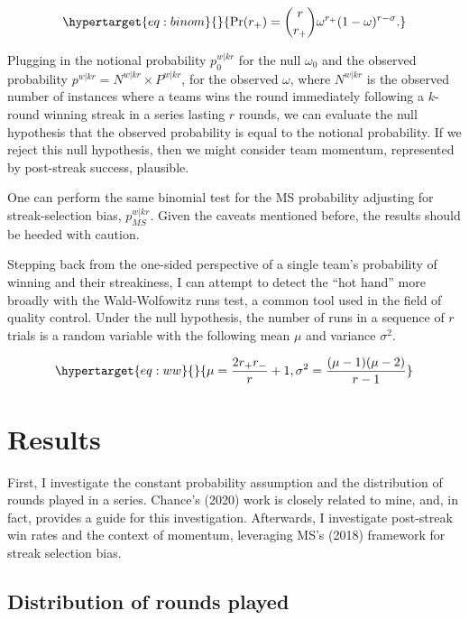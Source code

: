 \documentclass{article}
\begin{document}
\begin{equation}\protect\hypertarget{eq:binom}{}{
\Pr(r_+) = {\binom {r}{r_+}} \omega^{r_+}(1-\omega)^{r-\sigma}.
}\label{eq:binom}\end{equation}

Plugging in the notional probability \(p^{w|kr}_0\) for the null
\(\omega_0\) and the observed probability
\(p^{w|kr} = N^{w|kr} \times P^{w|kr}\), for the observed \(\omega\),
where \(N^{w|kr}\) is the observed number of instances where a teams
wins the round immediately following a \(k\)-round winning streak in a
series lasting \(r\) rounds, we can evaluate the null hypothesis that
the observed probability is equal to the notional probability. If we
reject this null hypothesis, then we might consider team momentum,
represented by post-streak success, plausible.

One can perform the same binomial test for the MS probability adjusting
for streak-selection bias, \(p^{w|kr}_{MS}\). Given the caveats
mentioned before, the results should be heeded with caution.

Stepping back from the one-sided perspective of a single team's
probability of winning and their streakiness, I can attempt to detect
the ``hot hand'' more broadly with the Wald-Wolfowitz runs test, a
common tool used in the field of quality control. Under the null
hypothesis, the number of runs in a sequence of \(r\) trials is a random
variable with the following mean \(\mu\) and variance \(\sigma^2\).

\begin{equation}\protect\hypertarget{eq:ww}{}{
\mu = \frac{2r_+r_-}{r} + 1, \sigma^2 = \frac{(\mu-1)(\mu-2)}{r-1}
}\label{eq:ww}\end{equation}

\hypertarget{results}{%
\section{Results}\label{results}}

First, I investigate the constant probability assumption and the
distribution of rounds played in a series. Chance's (2020) work is
closely related to mine, and, in fact, provides a guide for this
investigation. Afterwards, I investigate post-streak win rates and the
context of momentum, leveraging MS's (2018) framework for streak
selection bias.

\hypertarget{sec:results-rounds-played}{%
\subsection{Distribution of rounds
played}\label{sec:results-rounds-played}}
\end{document}
